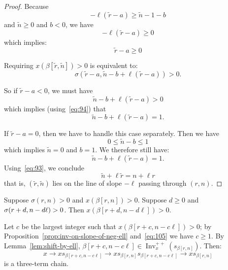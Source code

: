 \documentclass[ALCO,ThmDefs,Unicode]{cedram}
\DeclareMathOperator{\Inv}{Inv}
\newcommand{\Invplusplusx}{\Inv^{++}_x}
\newcommand{\tr}{\widetilde{r}}
\newcommand{\tn}{\widetilde{n}}
\begin{document}
\begin{proof}
Because
\begin{equation}\label{eq:96}
- \ell (\tr -a) \geq \tn -1 - b
\end{equation}
and $\tn \geq 0$ and $b < 0$, we have
\begin{equation}\label{eq:97}
- \ell (\tr -a) \geq 0
\end{equation}
which implies:
\begin{equation}\label{eq:98}
\tr -a \geq 0
\end{equation}

Requiring $x(\beta[\tr,\tn]) >0$ is equivalent to:
\begin{equation}\label{eq:99}
\sigma(\tr-a, \tn - b + \ell (\tr -a)) >0.
\end{equation}

So if $\tr -a < 0$, we must have
\begin{equation}\label{eq:100}
\tn - b + \ell (\tr -a) > 0
\end{equation}
which implies (using~\eqref{eq:94}) that
\begin{equation}\label{eq:101}
\tn - b + \ell (\tr -a) = 1.
\end{equation}

If $\tr -a = 0$, then we have to handle this case separately. Then we have
\begin{equation}\label{eq:102}
0 \leq \tn - b \leq 1
\end{equation}
which implies $\tn = 0$ and $b = 1$. We therefore still have:
\begin{equation}\label{eq:103}
\tn - b +\ell (\tr -a) = 1.
\end{equation}
Using~\eqref{eq:93}, we conclude
\begin{equation}\label{eq:50}
\tn + \ell \tr = n + \ell r
\end{equation}
that is, $(\tr,\tn)$ lies on the line of slope $-\ell$ passing through $(r,n)$.
\end{proof}

\begin{lemm}\label{lem:shift-by-ell}
Suppose $\sigma(r,n) >0$ and $x(\beta[r,n]) > 0$. Suppose $d \geq 0$ and $\sigma(r+d,\linebreak n-d\ell)>0$. Then $ x(\beta[r+d,n-d\ell]) > 0 $.
\end{lemm}

Let $c$ be the largest integer such that $x(\beta[r+c,n-c\ell]) > 0$; by Proposition~\ref{prop:inv-on-slope-of-neg-ell} and~\eqref{eq:105} we have $c \geq 1$. By Lemma~\ref{lem:shift-by-ell}, $\beta[r+c,n-c\ell] \in \Invplusplusx(s_{\beta[r,n]})$. Then:
\begin{equation}\label{eq:83}
x \rightarrow x s_{\beta[r+c, n- c\ell]} \rightarrow x s_{\beta[r,n]} s_{\beta[r+c, n- c\ell]}
\rightarrow x s_{\beta[r,n]}
\end{equation}
is a three-term chain.
\end{document}
